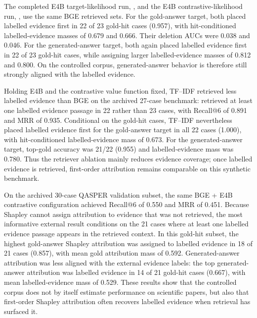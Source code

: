 \documentclass[10pt]{article}
\begin{document}
The completed E4B target-likelihood run,
, and the E4B
contrastive-likelihood run,
, use the
same BGE retrieved sets. For the gold-answer target, both placed labelled
evidence first in 22 of 23 gold-hit cases (0.957), with hit-conditioned
labelled-evidence masses of 0.679 and 0.666. Their deletion AUCs were 0.038 and
0.046. For the generated-answer target, both again placed labelled evidence
first in 22 of 23 gold-hit cases, while assigning larger labelled-evidence
masses of 0.812 and 0.800. On the controlled corpus, generated-answer behavior
is therefore still strongly aligned with the labelled evidence.

Holding E4B and the contrastive value function fixed, TF--IDF retrieved less
labelled evidence than BGE on the archived 27-case benchmark:
retrieved at least one labelled evidence passage in 22 rather than 23 cases,
with Recall@6 of 0.891 and MRR of 0.935. Conditional on the gold-hit cases,
TF--IDF nevertheless placed labelled evidence first for the gold-answer target
in all 22 cases (1.000), with hit-conditioned labelled-evidence mass of 0.673.
For the generated-answer target, top-gold accuracy was 21/22 (0.955) and
labelled-evidence mass was 0.780. Thus the retriever ablation mainly reduces
evidence coverage; once labelled evidence is retrieved, first-order attribution
remains comparable on this synthetic benchmark.

On the archived 30-case QASPER validation subset, the same BGE + E4B contrastive
configuration achieved Recall@6 of 0.550 and MRR of 0.451. Because Shapley
cannot assign attribution to evidence that was not retrieved, the most
informative external result conditions on the 21 cases where at least one
labelled evidence passage appears in the retrieved context. In this gold-hit
subset, the highest gold-answer Shapley attribution was assigned to labelled
evidence in 18 of 21 cases (0.857), with mean gold attribution mass of 0.592.
Generated-answer attribution was less aligned with the external evidence
labels: the top generated-answer attribution was labelled evidence in 14 of
21 gold-hit cases (0.667), with mean labelled-evidence mass of 0.529. These
results show that the controlled corpus does not by itself estimate
performance on scientific papers, but also that first-order Shapley attribution
often recovers labelled evidence when retrieval has surfaced it.
\end{document}
